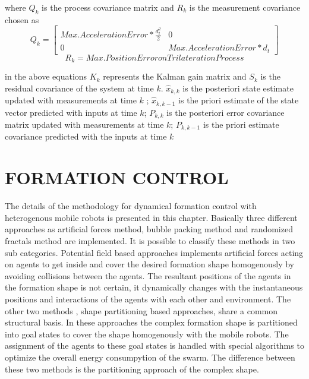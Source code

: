 \documentclass[twoside]{article}
\begin{document}
\begin{multicols}{2}
		
		where $Q_k$ is the process covariance matrix and $R_k$ is the measurement covariance chosen as 
		\begin{equation}
Q_k = \begin{bmatrix}
Max. Acceleration Error * \frac{d^2_t}{2} & 0 \\
0 & Max. Acceleration Error * d_t
\end{bmatrix}
		\end{equation}
		\begin{equation}
R_k = Max. Position Error on Trilateration Process
		\end{equation}
		
	in the above equations $K_k$ represents the Kalman gain matrix and $S_k$ is the residual covariance of the system at time $k$. $\hat{x}_{k,k}$ is the posteriori state estimate updated with measurements at time $k$ ;  $\hat{x}_{k,k-1}$ is the priori estimate of the state vector predicted with inputs at time $k$; $P_{k,k}$ is the posteriori error covariance matrix updated with measurements at time $k$; $P_{k,k-1}$ is the priori estimate covariance predicted with the inputs at time $k$
		
		
		
\section{FORMATION CONTROL}		
  The details of the methodology for dynamical formation control with heterogenous mobile robots is presented in this chapter. Basically three different approaches as artificial forces method, bubble packing method and randomized fractals method are implemented. It is possible to classify these methods in two sub categories. Potential field based approaches implements artificial forces acting on agents to get inside and cover the desired formation shape homogenously by avoiding collisions between the agents. The resultant positions of the agents in the formation shape is not certain, it dynamically changes with the instantaneous positions and interactions of the agents with each other and environment. The other two methods , shape partitioning based approaches, share a common structural basis. In these approaches the complex formation shape is partitioned into goal states to cover the shape homogenously with the mobile robots. The assignment of the agents to these goal states is handled with special algorithms to optimize the overall energy consumpytion of the swarm. The difference between these two methods is the partitioning approach of the complex shape. 
		

\end{multicols}
\end{document}
